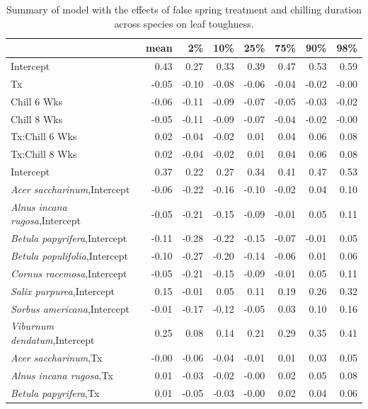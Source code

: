 \documentclass{article}\usepackage[]{graphicx}\usepackage[]{color}
\begin{document}
\newpage
\begin{longtable}{lrrrrrrr}
\caption{Summary of model with the effects of false spring treatment and chilling duration across species on leaf toughness.} \\ 
  \hline
 & mean & 2\% & 10\% & 25\% & 75\% & 90\% & 98\% \\ 
  \hline \endhead  \hline
Intercept & 0.43 & 0.27 & 0.33 & 0.39 & 0.47 & 0.53 & 0.59 \\ 
  Tx & -0.05 & -0.10 & -0.08 & -0.06 & -0.04 & -0.02 & -0.00 \\ 
  Chill 6 Wks & -0.06 & -0.11 & -0.09 & -0.07 & -0.05 & -0.03 & -0.02 \\ 
  Chill 8 Wks & -0.05 & -0.11 & -0.09 & -0.07 & -0.04 & -0.02 & -0.00 \\ 
  Tx:Chill 6 Wks & 0.02 & -0.04 & -0.02 & 0.01 & 0.04 & 0.06 & 0.08 \\ 
  Tx:Chill 8 Wks & 0.02 & -0.04 & -0.02 & 0.01 & 0.04 & 0.06 & 0.08 \\ 
  Intercept & 0.37 & 0.22 & 0.27 & 0.34 & 0.41 & 0.47 & 0.53 \\ 
  \textit{Acer saccharinum},Intercept & -0.06 & -0.22 & -0.16 & -0.10 & -0.02 & 0.04 & 0.10 \\ 
  \textit{Alnus incana rugosa},Intercept & -0.05 & -0.21 & -0.15 & -0.09 & -0.01 & 0.05 & 0.11 \\ 
  \textit{Betula papyrifera},Intercept & -0.11 & -0.28 & -0.22 & -0.15 & -0.07 & -0.01 & 0.05 \\ 
  \textit{Betula populifolia},Intercept & -0.10 & -0.27 & -0.20 & -0.14 & -0.06 & 0.01 & 0.06 \\ 
  \textit{Cornus racemosa},Intercept & -0.05 & -0.21 & -0.15 & -0.09 & -0.01 & 0.05 & 0.11 \\ 
  \textit{Salix purpurea},Intercept & 0.15 & -0.01 & 0.05 & 0.11 & 0.19 & 0.26 & 0.32 \\ 
  \textit{Sorbus americana},Intercept & -0.01 & -0.17 & -0.12 & -0.05 & 0.03 & 0.10 & 0.16 \\ 
  \textit{Viburnum dendatum},Intercept & 0.25 & 0.08 & 0.14 & 0.21 & 0.29 & 0.35 & 0.41 \\ 
  \textit{Acer saccharinum},Tx & -0.00 & -0.06 & -0.04 & -0.01 & 0.01 & 0.03 & 0.05 \\ 
  \textit{Alnus incana rugosa},Tx & 0.01 & -0.03 & -0.02 & -0.00 & 0.02 & 0.05 & 0.08 \\ 
  \textit{Betula papyrifera},Tx & 0.01 & -0.05 & -0.03 & -0.00 & 0.02 & 0.04 & 0.06 \\ 

\end{longtable}
\end{document}
